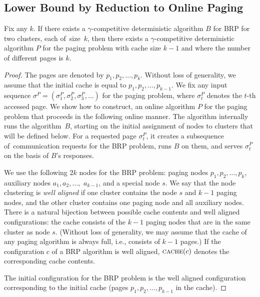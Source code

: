 \subsection{Lower Bound by Reduction to Online Paging}
\label{sec:paging}

\begin{theorem}
Fix any $k$. If there exists a $\gamma$-competitive deterministic algorithm $B$
for BRP for two clusters, each of~size~$k$, then there exists a
$\gamma$-competitive deterministic algorithm $P$ for the paging problem with 
cache size $k-1$ and where the number of different pages is $k$.
\end{theorem}

\begin{proof}
The pages are denoted by $p_1,p_2,\ldots,p_k$. Without loss of generality, we
assume that the initial cache is equal to $p_1,p_2,\ldots,p_{k-1}$. We fix any
input sequence $\sigma^P = (\sigma^P_1, \sigma^P_2, \sigma^P_3, \ldots)$ for the
paging problem, where $\sigma^P_t$ denotes the $t$-th accessed page. We show
how to construct, an online algorithm $P$ for the paging
problem that proceeds in the following online manner. 
The algorithm internally runs the algorithm~$B$, 
starting on the initial assignment of nodes to clusters that will be
defined below. For a requested page $\sigma^P_t$, it creates a subsequence
of~communication requests for the BRP problem, runs $B$ on them, and serves
$\sigma^P_t$ on the basis of $B$'s responses.

We use the following $2k$ nodes for the BRP problem: paging nodes $p_1,p_2,
\ldots, p_k$, auxiliary nodes $a_1,a_2,\ldots,$ $a_{k-1}$, and a special node
$s$. We say that the node clustering is \emph{well aligned} if one cluster
contains the node $s$ and $k-1$ paging nodes, and the other cluster contains
one paging node and all auxiliary nodes. There is a natural bijection between
possible cache contents and well aligned configurations: the cache consists of
the $k-1$ paging nodes that are in the same cluster as node $s$. (Without loss
of generality, we may assume that the cache of any paging algorithm is always
full, i.e., consists of $k-1$ pages.) If the configuration $c$ of a BRP
algorithm is well aligned, $\textsc{cache}(c)$ denotes the corresponding cache
contents.

The initial configuration for the BRP problem is the well aligned
configuration corresponding to the initial cache (pages
$p_1,p_2,\ldots,p_{k-1}$ in the cache).


\end{proof}
